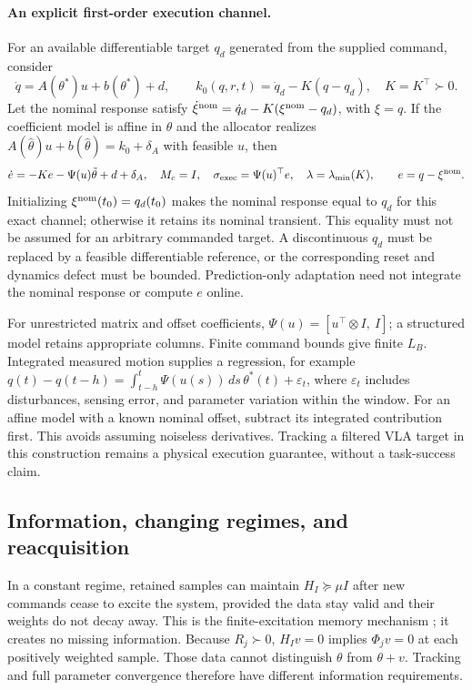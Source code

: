 \paragraph{An explicit first-order execution channel.}
For an available differentiable target $q_d$ generated from the supplied
command, consider
\begin{equation}
 \dot q=A(\theta^*)u+b(\theta^*)+d,\qquad
 k_0(q,r,t)=\dot q_d-K(q-q_d),\quad K=K^\top\succ0.
 \label{eq:gen-innerloop}
\end{equation}
Let the nominal response satisfy
$\dot\xi^{\rm nom}=\dot q_d-K(\xi^{\rm nom}-q_d)$, with $\xi=q$. If the coefficient
model is affine in $\theta$ and the allocator realizes
$A(\hat\theta)u+b(\hat\theta)=k_0+\delta_A$ with feasible $u$, then
\begin{equation}
 \dot e=-Ke-\Psi(u)\tilde\theta+d+\delta_A,\quad
 M_c=I,\quad \sigma_{\rm exec}=\Psi(u)^\top e,\quad
 \lambda=\lambda_{\min}(K),\qquad e=q-\xi^{\rm nom}.
 \label{eq:gen-innerloop-storage}
\end{equation}
Initializing $\xi^{\rm nom}(t_0)=q_d(t_0)$ makes the nominal response equal to
$q_d$ for this exact channel; otherwise it retains its nominal transient.
This equality must not be assumed for an arbitrary commanded target.
A discontinuous $q_d$ must be replaced by a feasible differentiable
reference, or the corresponding reset and dynamics defect must be bounded.
Prediction-only adaptation need not integrate the nominal response or
compute $e$ online.

For unrestricted matrix and offset coefficients,
$\Psi(u)=[u^\top\otimes I,\ I]$; a structured model retains appropriate
columns. Finite command bounds give finite $L_B$. Integrated measured
motion supplies a regression, for example
$q(t)-q(t-h)=\int_{t-h}^t\Psi(u(s))\,ds\,\theta^*(t)+\varepsilon_t$,
where $\varepsilon_t$ includes disturbances, sensing error, and parameter
variation within the window. For an affine model with a known nominal
offset, subtract its integrated contribution first. This avoids assuming
noiseless derivatives. Tracking a filtered VLA target in this construction
remains a physical execution guarantee, without a task-success claim.

\subsection{Information, changing regimes, and reacquisition}
\label{app:gen-regimes}
In a constant regime, retained samples can maintain
$H_I\succeq\mu I$ after new commands cease to excite the system, provided
the data stay valid and their weights do not decay away. This is the
finite-excitation memory mechanism
\citep{chowdhary2010concurrent,parikh2019integral}; it creates no missing
information. Because $R_j\succ0$, $H_Iv=0$ implies
$\Phi_jv=0$ at each positively weighted sample. Those data cannot
distinguish $\theta$ from $\theta+v$. Tracking and full parameter
convergence therefore have different information requirements.

